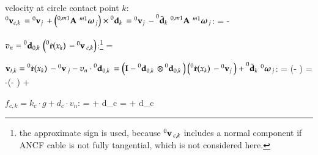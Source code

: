   \item velocity at circle contact point $k$: $\prescript{0}{}{\mathbf{v}_{c,k}}\, = \prescript{0}{}{\mathbf{v}_j}\, + \left( \prescript{0,m1}{}{\mathbf{A}}\, \prescript{m1}{}{\mbox{\boldmath $\omega$ \unboldmath}\!\!}\,_{j} \right) \times \prescript{0}{}{\mathbf{d}_k}\, = \prescript{0}{}{\mathbf{v}_j}\, - \prescript{0}{}{\tilde {\mathbf{d}}_k}\, \prescript{0,m1}{}{\mathbf{A}}\, \prescript{m1}{}{\mbox{\boldmath $\omega$ \unboldmath}\!\!}\,_{j} $:
  \be
     =  -  
  \ee
  \item $v_n = \prescript{0}{}{\mathbf{d}_{0,k}}\, \left( \prescript{0}{}{\dot {\mathbf{r}}(x_{k})}\, - \prescript{0}{}{\mathbf{v}}\,_{c,k} \right)$:\footnote{the approximate sign is used, because $\prescript{0}{}{\mathbf{v}}\,_{c,k}$ includes a normal component if ANCF cable is not fully tangential, which is not considered here.}
  \be
     = \ANCFdkO {} 
    \approx %
        \ANCFdkOtp \diffANCFdk
  \ee
  \item $\mathbf{v}_{t,k} = \prescript{0}{}{\dot {\mathbf{r}}(x_{k})}\, - \prescript{0}{}{\mathbf{v}}\,_j - v_n \cdot \prescript{0}{}{\mathbf{d}_{0,k}}\, =
  \left(\mathbf{I} - \prescript{0}{}{\mathbf{d}_{0,k}}\, \otimes \prescript{0}{}{\mathbf{d}_{0,k}}\, \right) \left( \prescript{0}{}{\dot {\mathbf{r}}(x_{k})}\, - \prescript{0}{}{\mathbf{v}_j}\, \right) 
      +\prescript{0}{}{\tilde {\mathbf{d}}_k}\, \prescript{0}{}{\mbox{\boldmath $\omega$ \unboldmath}\!\!}\,_{j} $:
  \be
     = \left(\Im - \ANCFdkO \otimes \ANCFdkO \right) 
  \ee
  \be
     = -\left(\Im - \ANCFdkO \otimes \ANCFdkO \right)  +  
  \ee
  \item $f_{c,k} = k_c \cdot g  + d_c \cdot v_n$:
  \be 
     =   + d_c \cdot {}
    \approx {}
  \ee
  \be 
     =   + d_c \cdot {}
    \approx {}
  \ee
  \be 
  \ee  
  \be 
